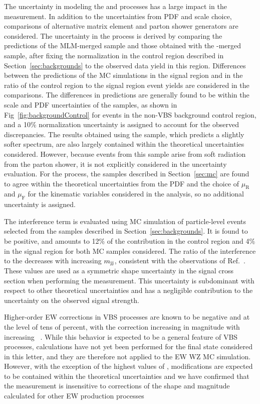 The uncertainty in modeling the \EWWZ and \QCDWZ
processes has a large impact in the \EWWZ measurement.
In addition to the uncertainties from PDF and scale choice, 
comparisons of alternative matrix element and parton shower generators are
considered.
The uncertainty in the \QCDWZ process is derived by
comparing the predictions of the MLM-merged sample and those obtained with the \FxFx-merged sample,
after fixing the normalization in the control region described in Section~\ref{sec:backgrounds}
to the observed data yield in this region.
Differences between the predictions of the MC simulations
in the signal region and in the ratio
of the control region to the signal region event yields
are considered in the comparisons.
The differences in predictions are generally found to be
within the scale and PDF uncertainties of the samples,
as shown in Fig~\ref{fig:backgroundControl} for events
in the non-VBS background control region,
and a 10\% normalization uncertainty is assigned to account for
the observed discrepancies.
The results obtained using the \POWHEG sample,
which predicts a slightly softer {\mjj} spectrum, are also largely contained 
within the theoretical uncertainties considered.
However, because \WZjj events from this sample arise from
soft radiation from the parton shower, it is 
not explicitly considered in the uncertainty evaluation.
For the \EWWZ process, the samples described in Section~\ref{sec:mc}
are found to agree within
the theoretical uncertainties from the PDF and the choice of 
$\mu_{\mathrm{R}}$ and $\mu_{\mathrm{F}}$ 
for the kinematic variables considered in the analysis,
so no additional uncertainty is
assigned. 

The interference term is evaluated using MC simulation of particle-level events
selected from the samples described in Section~\ref{sec:backgrounds}. 
It is found to be positive, and amounts to 12\% 
of the \EWWZ contribution in the control region and 4\% in the signal region
for both MC samples considered. 
The ratio of the interference to the \EWWZ 
decreases with increasing $m_{\mathrm{jj}}$, consistent with the observations of Ref.~\cite{leshouches2017}.
These values are used as a symmetric shape uncertainty in the 
signal cross section when performing the 
\EWWZ measurement.
This uncertainty is subdominant with respect to other theoretical uncertainties 
and has a negligible contribution to the uncertainty 
on the observed \EWWZ signal strength.

Higher-order EW corrections in VBS processes are known to be negative and at
the level of tens of percent, with the correction increasing in magnitude 
with increasing {\mjj}~\cite{Biedermann:2016yds}.
While this behavior is expected to be a general feature of VBS processes, 
calculations have not yet been performed for the final state considered 
in this letter, and they are therefore not applied to the EW WZ MC simulation. 
However, with the exception of the highest values of {\mjj}, modifications 
are expected to be contained within the theoretical uncertainties and 
we have confirmed that the \EWWZ measurement is 
insensitive to corrections of the shape and magnitude calculated for 
other EW production processes

